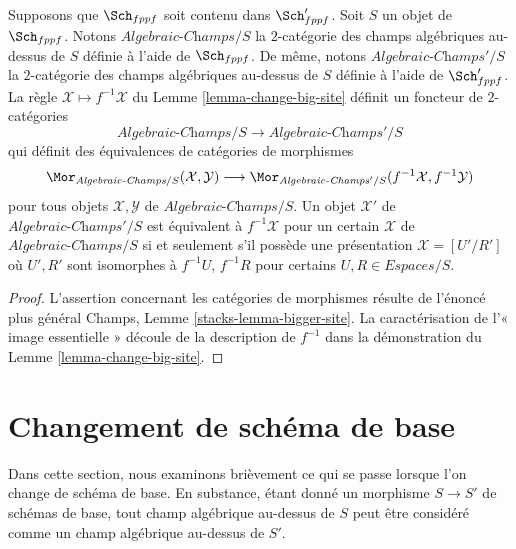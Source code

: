 \begin{lemma}
\label{lemma-fully-faithful}
Supposons que $\Sch_{fppf}$ soit contenu dans $\Sch'_{fppf}$.
Soit $S$ un objet de $\Sch_{fppf}$. Notons
$\textit{Algebraic-Champs}/S$ la $2$-catégorie des champs algébriques au-dessus de $S$
définie à l'aide de $\Sch_{fppf}$. De même, notons
$\textit{Algebraic-Champs}'/S$ la $2$-catégorie des champs algébriques au-dessus de $S$
définie à l'aide de $\Sch'_{fppf}$. La règle
$\mathcal{X} \mapsto f^{-1}\mathcal{X}$ du
Lemme \ref{lemma-change-big-site}
définit un foncteur de $2$-catégories
$$
\textit{Algebraic-Champs}/S \longrightarrow \textit{Algebraic-Champs}'/S
$$
qui définit des équivalences de catégories de morphismes
$$
\Mor_{\textit{Algebraic-Champs}/S}(\mathcal{X}, \mathcal{Y})
\longrightarrow
\Mor_{\textit{Algebraic-Champs}'/S}(f^{-1}\mathcal{X}, f^{-1}\mathcal{Y})
$$
pour tous objets $\mathcal{X}, \mathcal{Y}$ de
$\textit{Algebraic-Champs}/S$. Un objet
$\mathcal{X}'$ de $\textit{Algebraic-Champs}'/S$
est équivalent à $f^{-1}\mathcal{X}$ pour un certain
$\mathcal{X}$ de $\textit{Algebraic-Champs}/S$
si et seulement s'il possède une présentation $\mathcal{X} = [U'/R']$
où $U', R'$ sont isomorphes à $f^{-1}U$, $f^{-1}R$ pour certains
$U, R \in \textit{Espaces}/S$.
\end{lemma}

\begin{proof}
L'assertion concernant les catégories de morphismes résulte de l'énoncé plus général
Champs, Lemme \ref{stacks-lemma-bigger-site}.
La caractérisation de l'« image essentielle » découle de la description
de $f^{-1}$ dans la démonstration du
Lemme \ref{lemma-change-big-site}.
\end{proof}


\section{Changement de schéma de base}
\label{section-change-base-scheme}

\noindent
Dans cette section, nous examinons brièvement ce qui se passe lorsque l'on change de schéma de base.
En substance, étant donné un morphisme $S \to S'$ de schémas de base, tout champ
algébrique au-dessus de $S$ peut être considéré comme un champ algébrique au-dessus de $S'$.

